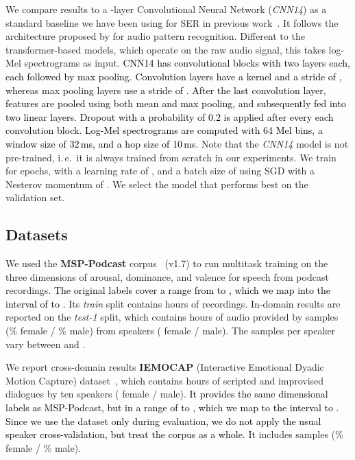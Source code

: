 \documentclass{article}
\newcommand\cnn{\mbox{\emph{CNN14}}}
\newcommand{\review}[1]{\textcolor{black}{#1}}
\newcommand\msppodcast{\mbox{MSP-Podcast}}
\newcommand\iemocap{\mbox{IEMOCAP}}
\newcommand{\ie}{i.\,e.\ }
\begin{document}
We compare results to a -layer Convolutional Neural Network ({\cnn}) as a standard baseline
we have been using for \ac{SER} in previous work~\citep{triantafyllopoulos2021role, triantafyllopoulos2021multistage}. 
It follows the architecture proposed by \citet{kong2019panns} for audio pattern recognition. 
Different to the transformer-based models,
which operate on the raw audio signal,
this takes log-Mel spectrograms as input. 
\review{
CNN14 has  convolutional blocks with two layers each, each followed by max pooling.
Convolution layers have a  kernel and a stride of , whereas max pooling layers use a stride of .
After the last convolution layer, features are pooled using both mean and max pooling, and subsequently fed into two linear layers.
Dropout with a probability of 0.2 is applied after every each convolution block.
Log-Mel spectrograms are computed with 64 Mel bins, a window size of 32\,ms, and a hop size of 10\,ms.
}
Note that the {\cnn} model is not pre-trained,
\ie it is always trained from scratch in our experiments.
We train for  epochs,
with a learning rate of ,
and a batch size of 
using \ac{SGD} with a Nesterov momentum of .
We select the model that performs best on the validation set.




\subsection{Datasets}
\label{subsec:datasets}



We used the \textbf{\msppodcast} corpus~\citep{lotfian2019msppodcast} (v1.7)
to run multitask training on the three dimensions of arousal, dominance, and valence
for speech from podcast recordings.
\review{The original labels cover a range from  to , 
which we map into the interval of  to .}
Its \emph{train} split contains  hours of recordings. 
In-domain results are reported on the \emph{test-1} split,
which contains  hours of audio
provided by  samples (\% female / \% male)
from  speakers ( female /  male). 
The samples per speaker 
vary between  and . 

We report cross-domain results \textbf{\iemocap} (Interactive Emotional Dyadic Motion Capture) dataset~\cite{busso2008iemocap},
which contains  hours of scripted and improvised dialogues by ten speakers ( female /  male).
\review{It provides the same dimensional labels as {\msppodcast},
but in a range of  to , 
which we map to the interval  to .
Since we use the dataset only during evaluation, 
we do not apply the usual speaker cross-validation, but treat the corpus as a whole.}
It includes  samples (\% female / \% male). 
\end{document}
